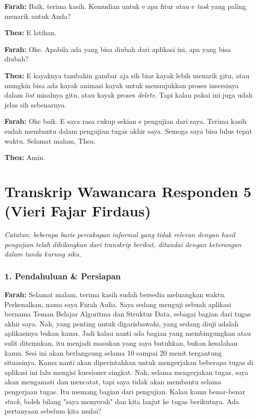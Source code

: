 \textbf{Farah:} Baik, terima kasih. Kemudian untuk e apa fitur atau e \textit{task} yang paling menarik untuk Anda?

\textbf{Thea:} E latihan.

\textbf{Farah:} Oke. Apabila ada yang bisa diubah dari aplikasi ini, apa yang bisa diubah?

\textbf{Thea:} E kayaknya tambahin gambar aja sih biar kayak lebih menarik gitu, atau mungkin bisa ada kayak animasi kayak untuk menunjukkan proses insersinya dalam \textit{list} misalnya gitu, atau kayak proses \textit{delete}. Tapi kalau pakai ini juga udah jelas sih sebenarnya.

\textbf{Farah:} Oke baik. E saya rasa cukup sekian e pengujian dari saya. Terima kasih sudah membantu dalam pengujian tugas akhir saya. Semoga saya bisa lulus tepat waktu. Selamat malam, Thea.

\textbf{Thea:} Amin.

\section{Transkrip Wawancara Responden 5 (Vieri Fajar Firdaus)}

\textit{Catatan: beberapa baris percakapan informal yang tidak relevan dengan hasil pengujian telah dihilangkan dari transkrip berikut, ditandai dengan keterangan dalam tanda kurung siku.}

\subsubsection*{1. Pendahuluan \& Persiapan}

\textbf{Farah:} Selamat malam, terima kasih sudah bersedia meluangkan waktu. Perkenalkan, nama saya Farah Aulia. Saya sedang menguji sebuah aplikasi bernama Teman Belajar Algoritma dan Struktur Data, sebagai bagian dari tugas akhir saya. Nah, yang penting untuk digarisbawahi, yang sedang diuji adalah aplikasinya bukan kamu. Jadi kalau nanti ada bagian yang membingungkan atau sulit ditemukan, itu menjadi masukan yang saya butuhkan, bukan kesalahan kamu. Sesi ini akan berlangsung selama 10 sampai 20 menit tergantung situasinya. Kamu nanti akan diperintahkan untuk mengerjakan beberapa tugas di aplikasi ini lalu mengisi kuesioner singkat. Nah, selama mengerjakan tugas, saya akan mengamati dan mencatat, tapi saya tidak akan membantu selama pengerjaan tugas. Itu memang bagian dari pengujian. Kalau kamu benar-benar \textit{stuck}, boleh bilang "saya menyerah" dan kita lanjut ke tugas berikutnya. Ada pertanyaan sebelum kita mulai?

